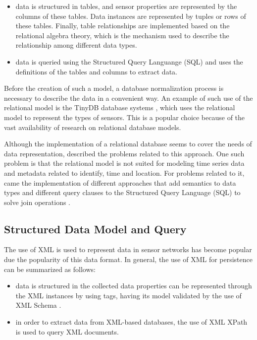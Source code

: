 \begin{itemize}
  \item data is structured in tables, and sensor properties are represented by
  the columns of these tables. Data instances are represented by tuples or rows
  of these tables. Finally, table relationships are implemented based on the
  relational algebra theory, which is the mechanism used to describe the
  relationship among different data types.
  \item data is queried using the Structured Query Languange (SQL) and uses the
  definitions of the tables and columns to extract data.
\end{itemize}

Before the creation of such a model, a database normalization process is
necessary to describe the data in a convenient way. An example of such use of
the relational model is the TinyDB database systems \cite{sn-db-tinydb}, which
uses the relational model to represent the types of sensors. This is a popular
choice because of the vast availability of research on relational database
models.

Although the implementation of a relational database seems to cover the needs
of data representation, \cite{sn-data-model-survey} described the problems
related to this approach. One such problem is that the relational model is not
suited for modeling time series data and metadata related to identify, time
and location. For problems related to it, came the implementation of different
approaches that add semantics to data types and different query clauses to the
Structured Query Language (SQL) to solve join operations \cite{sn-db-newop}. 

\subsection{Structured Data Model and Query}

The use of XML is used to represent data in sensor networks has become popular
due the popularity of this data format. In general, the use of XML for
persistence can be summarized as follows:

\begin{itemize}
  \item data is structured in the collected data properties can be represented
  through the XML \cite{xml} instances by using tags, having its model validated
  by the use of XML Schema \cite{xml-schema}.
  \item in order to extract data from XML-based databases, the use of XML XPath
  \cite{xml-xpath} is used to query XML documents.
\end{itemize}

